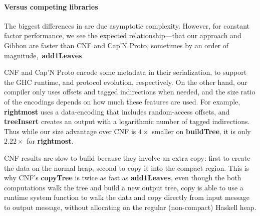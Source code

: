 \paragraph{Versus competing libraries}


The biggest differences in  are due
asymptotic complexity.
However, for constant factor performance, we see the expected
relationship---that our approach and Gibbon are faster than CNF and Cap'N Proto,
sometimes by an order of magnitude, \eg\,{\bf add1Leaves}.

CNF and Cap'N Proto encode some metadata in their serialization, to
support the GHC runtime, and protocol evolution, respectively.
On the other hand,
our compiler only uses offsets and tagged indirections
when needed, and the size ratio of the encodings depends on how much these features are used.
%
For example, {\bf rightmost} uses a data-encoding that includes random-access
offsets, and {\bf treeInsert} creates an output with a logarithmic number of
tagged indirections.  Thus while our size advantage over CNF is
%
$4\times$ smaller
%
on {\bf buildTree}, it is only
%
$2.22\times$
%
for {\bf rightmost}.

CNF results are slow to build because they involve an extra copy: first to
create the data on the normal heap, second to copy it into the compact region.
This is why CNF's {\bf copyTree} is twice as fast as {\bf add1Leaves}, even
though the both computations walk the tree and build a new output tree, copy is
able to use a runtime system function to walk the data and copy directly from
input message to output message, without allocating on the regular (non-compact)
Haskell heap.

